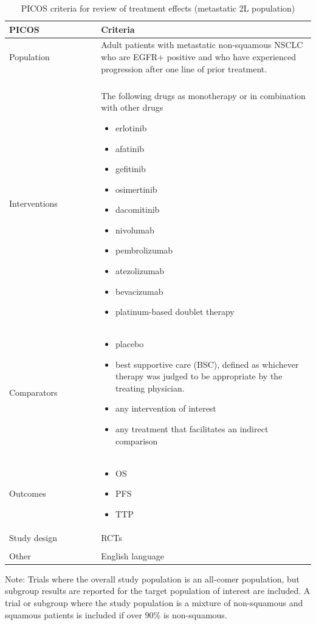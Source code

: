\documentclass[11pt,final,fleqn]{article}\usepackage[]{graphicx}\usepackage[]{color}
\theoremstyle{plain}
\begin{document}
\begin{appendices}
\begin{table}[!ht]
\begin{center}
\begin{threeparttable}
\caption{PICOS criteria for review of treatment effects (metastatic 2L population)} \label{tbl:picos-tx-effects-2L}
\begin{tabular}{p{0.3\linewidth}p{0.7\linewidth}}
\hline
\multicolumn{1}{l}{PICOS} &  \multicolumn{1}{l}{Criteria}\\
\hline
Population & Adult patients with metastatic non-squamous NSCLC who are EGFR+ positive and
who have experienced progression after one line of prior treatment.\\
&\\
Interventions & The following drugs as monotherapy or in combination with other drugs 
\begin{itemize}
\item erlotinib
\item afatinib
\item gefitinib
\item osimertinib
\item dacomitinib
\item nivolumab
\item pembrolizumab
\item atezolizumab
\item bevacizumab
\item platinum-based doublet therapy
\end{itemize} \\
Comparators & 
\begin{itemize}
\item placebo
\item best supportive care (BSC), defined as whichever therapy was judged to be appropriate by the treating physician.
\item any intervention of interest
\item any treatment that facilitates an indirect comparison
\end{itemize} \\
Outcomes & 
\begin{itemize}
\item OS
\item PFS
\item TTP
\end{itemize} \\
Study design & RCTs \\
&\\
Other & English language\\
\hline
\end{tabular}
\scriptsize Note: Trials where the overall study population is an all-comer population, but subgroup results are reported for the target population of interest are included. A trial or subgroup where the study population is a mixture of non-squamous and squamous patients is included if over 90\% is non-squamous.  
\end{threeparttable}
\end{center}
\end{table}


\end{appendices}
\end{document}

